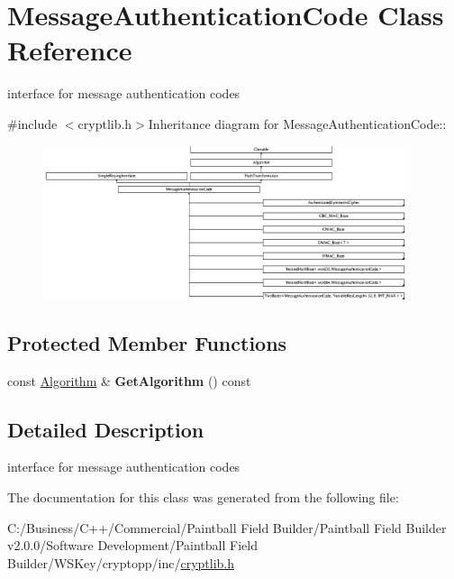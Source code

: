 \hypertarget{class_message_authentication_code}{
\section{MessageAuthenticationCode Class Reference}
\label{class_message_authentication_code}
}


interface for message authentication codes  


{\ttfamily \#include $<$cryptlib.h$>$}Inheritance diagram for MessageAuthenticationCode::\begin{figure}[H]
\begin{center}
\leavevmode
\includegraphics[height=4.50704cm]{class_message_authentication_code}
\end{center}
\end{figure}
\subsection*{Protected Member Functions}
\begin{DoxyCompactItemize}
\item 
\hypertarget{class_message_authentication_code_a2e3a8b3f8e5cf8599fdfb431d96518a5}{
const \hyperlink{class_algorithm}{Algorithm} \& {\bfseries GetAlgorithm} () const }
\label{class_message_authentication_code_a2e3a8b3f8e5cf8599fdfb431d96518a5}

\end{DoxyCompactItemize}


\subsection{Detailed Description}
interface for message authentication codes 

The documentation for this class was generated from the following file:\begin{DoxyCompactItemize}
\item 
C:/Business/C++/Commercial/Paintball Field Builder/Paintball Field Builder v2.0.0/Software Development/Paintball Field Builder/WSKey/cryptopp/inc/\hyperlink{cryptlib_8h}{cryptlib.h}\end{DoxyCompactItemize}
